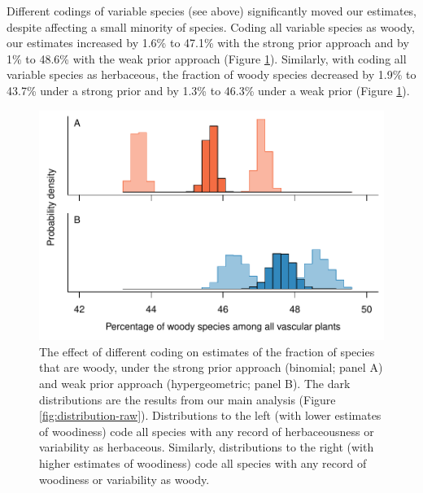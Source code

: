 Different codings of variable species (see above) significantly moved
our estimates, despite affecting a small minority of species.  Coding
all variable species as woody, our estimates
increased by 1.6\% to 47.1\% with the strong prior approach
and by 1\% to 48.6\% with the weak prior approach (Figure
\ref{fig:distribution-raw-errors}). Similarly, with coding
all variable species as herbaceous, the fraction of woody species
decreased by 1.9\% to 43.7\% under a strong prior
and by 1.3\% to 46.3\% under a weak prior (Figure
\ref{fig:distribution-raw-errors}).

\begin{figure}[p]
  \centering
  \includegraphics[width=\textwidth]{figs/distribution-raw-errors}
  \caption[The effect of character coding on estimates]{The effect of
    different coding on estimates of the fraction of species that are
    woody, under the strong prior approach (binomial; panel A) and
    weak prior approach (hypergeometric; panel B).  The dark
    distributions are the results from our main analysis
    (Figure \ref{fig:distribution-raw}).  Distributions to the left
    (with lower estimates of woodiness) code all species with any
    record of herbaceousness or variability as herbaceous.  Similarly,
    distributions to the right (with higher estimates of woodiness)
    code all species with any record of woodiness or variability as
    woody.}
  \label{fig:distribution-raw-errors}
\end{figure}

